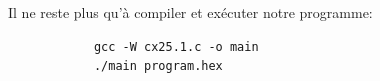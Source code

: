 \documentclass[a4paper,11pt]{article}
\begin{document}
        

        \bigskip
        \noindent Il ne reste plus qu'à compiler et exécuter notre programme:

        \begin{tcolorbox}[colback=lightgray!6, colframe=black, left=-20mm, right=5mm, top=2mm, bottom=-2mm, boxrule=0.1mm]
          \begin{verbatim}
            gcc -W cx25.1.c -o main
            ./main program.hex 
          \end{verbatim}
        \end{tcolorbox}

        \begin{figure}[ht]
        \end{figure} 
\end{document}
